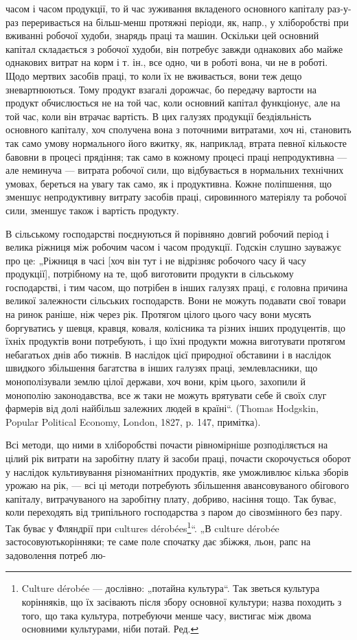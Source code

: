 часом і часом продукції, то й час зуживання вкладеного основного капіталу раз-у-раз переривається на
більш-менш протяжні періоди, як, напр., у хліборобстві при вживанні робочої худоби, знарядь праці та
машин. Оскільки цей основний капітал складається з робочої худоби, він потребує завжди однакових або
майже однакових витрат на корм і т. ін., все одно, чи в роботі вона, чи не в роботі. Щодо мертвих
засобів праці, то коли їх не вживається, вони теж дещо зневартнюються. Тому продукт взагалі
дорожчає, бо передачу вартости на продукт обчислюється не на той час, коли основний капітал
функціонує, але на той час, коли він втрачає вартість. В цих галузях продукції бездіяльність
основного капіталу, хоч сполучена вона з поточними витратами, хоч ні, становить так само умову
нормального його вжитку, як, наприклад, втрата певної кількосте бавовни в процесі прядіння; так само
в кожному процесі праці непродуктивна — але неминуча — витрата робочої сили, що відбувається в
нормальних технічних умовах, береться на увагу так само, як і продуктивна. Кожне поліпшення, що
зменшує непродуктивну витрату засобів праці, сировинного матеріялу та робочої сили, зменшує також і
вартість продукту.

В сільському господарстві поєднуються й порівняно довгий робочий період і велика ріжниця між робочим
часом і часом продукції. Годскін слушно зауважує про це: „Ріжниця в часі [хоч він тут і не відрізняє
робочого часу й часу продукції], потрібному на те, щоб виготовити продукти в сільському
господарстві, і тим часом, що потрібен в інших галузях праці, є головна причина великої залежности
сільських господарств. Вони не можуть подавати свої товари на ринок раніше, ніж через рік. Протягом
цілого цього часу вони мусять боргуватись у шевця, кравця, коваля, колісника та різних інших
продуцентів, що їхніх продуктів вони потребують, і що їхні продукти можна виготувати протягом
небагатьох днів або тижнів. В наслідок цієї природної обставини і в наслідок швидкого збільшення
багатства в інших галузях праці, землевласники, що монополізували землю цілої держави, хоч вони,
крім цього, захопили й монополію законодавства, все ж таки не можуть врятувати себе й своїх слуг
фармерів від долі найбільш залежних людей в країні“. (Thomas Hodgskin, Popular Political Economy,
London, 1827, p. 147, примітка).

Всі методи, що ними в хліборобстві почасти рівномірніше розподіляється на цілий рік витрати на
заробітну плату й засоби праці, почасти скорочується оборот у наслідок культивування різноманітних
продуктів, яке уможливлює кілька зборів урожаю на рік, — всі ці методи потребують збільшення
авансовуваного обігового капіталу, витрачуваного на заробітну плату, добриво, насіння тощо. Так
буває, коли переходять від трипільного господарства з паром до сівозмінного без пару. Так буває у
Фляндрії при cultures dérobées\footnote*{
Culture dérobée — дослівно: „потайна культура“. Так зветься культура корінняків, що їх засівають
після збору основної культури; назва походить з того, що така культура, потребуючи менше часу,
вистигає між двома основними культурами, ніби потай. Ред.
}“. „В culture dérobée застосовуютькорінняки; те саме поле спочатку
дає збіжжя, льон, рапс на задоволення потреб лю-